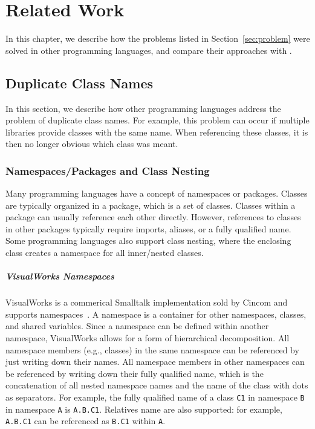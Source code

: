 \chapter{Related Work}
\label{sec:related}
In this chapter, we describe how the problems listed in Section~\ref{sec:problem} were solved in other programming languages, and compare their approaches with \msname.

\section{Duplicate Class Names}
In this section, we describe how other programming languages address the problem of duplicate class names. For example, this problem can occur if multiple libraries provide classes with the same name. When referencing these classes, it is then no longer obvious which class was meant.

\subsection{Namespaces/Packages and Class Nesting}
\label{sec:rel_ns_pkg_cls_nesting}
Many programming languages have a concept of namespaces or packages. Classes are typically organized in a package, which is a set of classes. Classes within a package can usually reference each other directly. However, references to classes in other packages typically require imports, aliases, or a fully qualified name. Some programming languages also support class nesting, where the enclosing class creates a namespace for all inner/nested classes.

\paragraph{VisualWorks Namespaces}
VisualWorks is a commerical Smalltalk implementation sold by Cincom and supports namespaces~\cite{brauer2015programming}. A namespace is a container for other namespaces, classes, and shared variables. Since a namespace can be defined within another namespace, VisualWorks allows for a form of hierarchical decomposition. All namespace members (e.g., classes) in the same namespace can be referenced by just writing down their names. All namespace members in other namespaces can be referenced by writing down their fully qualified name, which is the concatenation of all nested namespace names and the name of the class with dots as separators. For example, the fully qualified name of a class \texttt{C1} in namespace \texttt{B} in namespace \texttt{A} is \texttt{A.B.C1}. Relatives name are also supported: for example, \texttt{A.B.C1} can be referenced as \texttt{B.C1} within \texttt{A}.

